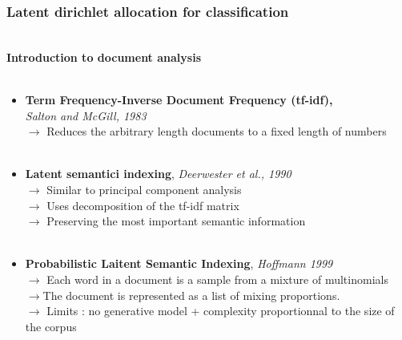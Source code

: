 \documentclass{beamer}
\begin{document}
\begin{frame}

\frametitle{Latent dirichlet allocation for classification}
~\\
\textbf{\large{Introduction to document analysis}}~\\
~\\
\begin{itemize}
\item \textbf{Term Frequency-Inverse Document Frequency (tf-idf),}~\\ \textit{Salton and McGill, 1983}~\\
$\rightarrow$ Reduces the arbitrary length documents to a fixed length of numbers~\\
~\\
\item \textbf{Latent semantici indexing}, \textit{Deerwester et al., 1990}~\\
$\rightarrow$ Similar to principal component analysis~\\
$\rightarrow$ Uses decomposition of the tf-idf matrix~\\
$ \rightarrow$ Preserving the most important semantic information~\\
~\\
\item \textbf{Probabilistic Laitent Semantic Indexing}, \textit{Hoffmann 1999}~\\
$\rightarrow$ Each word in a document is a sample from a mixture of multinomials~\\
$\rightarrow$The document is represented as a list of mixing proportions.~\\
$\rightarrow$ Limits : no generative model + complexity proportionnal to the size of the corpus
\end{itemize}

\end{frame}
\end{document}
